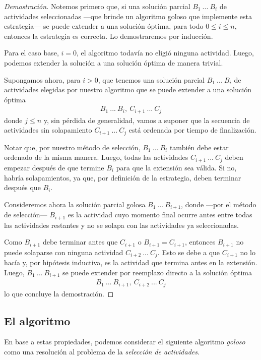 \begin{proof}[Demostración]
    Notemos primero que, si una solución parcial $B_1\ ...\ B_i$ de actividades seleccionadas ---que brinde un algoritmo goloso que implemente esta estrategia--- se puede extender a una solución óptima, para todo $0 \leq i \leq n$, entonces la estrategia es correcta. Lo demostraremos por inducción.

    Para el caso base, $i = 0$, el algoritmo todavía no eligió ninguna actividad. Luego, podemos extender la solución a una solución óptima de manera trivial.

    Supongamos ahora, para $i > 0$, que tenemos una solución parcial $B_1\ ...\ B_i$ de actividades elegidas por nuestro algoritmo que se puede extender a una solución óptima
    \begin{align}\nonumber
        B_1\ ...\ B_i,\ C_{i+1}\ ...\ C_j
    \end{align}
    donde $j \leq n$ y, sin pérdida de generalidad, vamos a suponer que la secuencia de actividades sin solapamiento $C_{i+1}\ ...\ C_j$ está ordenada por tiempo de finalización. 

    Notar que, por nuestro método de selección, $B_1\ ...\ B_i$ también debe estar ordenado de la misma manera. Luego, todas las actividades $C_{i+1}\ ...\ C_j$ deben empezar después de que termine $B_i$ para que la extensión sea válida. Si no, habría solapamientos, ya que, por definición de la estrategia, deben terminar después que $B_i$.

    Consideremos ahora la solución parcial golosa $B_1\ ...\ B_{i+1}$, donde ---por el método de selección--- $B_{i+1}$ es la actividad cuyo momento final ocurre antes entre todas las actividades restantes y no se solapa con las actividades ya seleccionadas. 

    Como $B_{i+1}$ debe terminar antes que $C_{i+1}$ o $B_{i+1} = C_{i+1}$, entonces $B_{i+1}$ no puede solaparse con ninguna actividad $C_{i+2}\ ...\ C_j$. Esto se debe a que $C_{i+1}$ no lo hacía y, por hipótesis inductiva, es la actividad que termina antes en la extensión. Luego, $B_1\ ...\ B_{i+1}$ se puede extender por reemplazo directo a la solución óptima 
    \begin{align}\nonumber
        B_1\ ...\ B_{i+1},\ C_{i+2}\ ...\ C_j
    \end{align}
    lo que concluye la demostración.
\end{proof}

\subsection{El algoritmo} En base a estas propiedades, podemos considerar el siguiente algoritmo \textit{goloso} como una resolución al problema de la \textit{selección de actividades}. 

